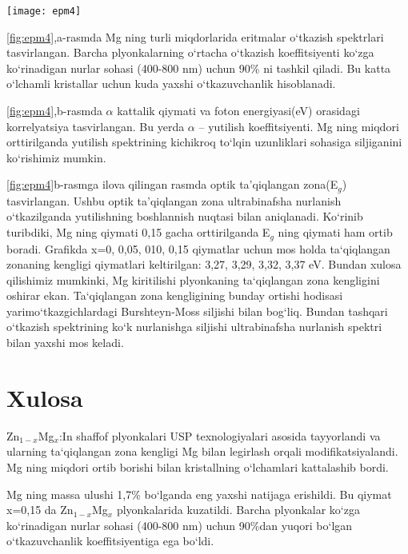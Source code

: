 \documentclass[14pt]{scrarticle}
\begin{document}
\begin{figure*}[h]
	\centering
	\texttt{[image: epm4]}
	\caption{Mg ning turli konsentratsiyalarida yupqa plyonkalarning o`tkazish spektri(a) va $\alpha$ qiymat va foto energiya orasidagi korrelyatsiya}
	\label{fig:epm4}
\end{figure*}
	\ref{fig:epm4},a-rasmda Mg ning turli miqdorlarida eritmalar o`tkazish spektrlari tasvirlangan. Barcha plyonkalarning o`rtacha o`tkazish koeffitsiyenti ko`zga ko`rinadigan nurlar sohasi (400-800 nm) uchun 90\% ni tashkil qiladi. Bu katta o`lchamli kristallar uchun kuda yaxshi o`tkazuvchanlik hisoblanadi.
	
\ref{fig:epm4},b-rasmda $\alpha$ kattalik qiymati va foton energiyasi(eV) orasidagi korrelyatsiya tasvirlangan. Bu yerda $\alpha$ -- yutilish koeffitsiyenti. Mg ning miqdori orttirilganda yutilish spektrining kichikroq to`lqin uzunliklari sohasiga siljiganini ko`rishimiz mumkin.  

\ref{fig:epm4}b-rasmga ilova qilingan rasmda optik ta'qiqlangan zona(E$_{g}$) tasvirlangan. Ushbu optik ta'qiqlangan zona ultrabinafsha nurlanish o`tkazilganda yutilishning boshlannish nuqtasi bilan aniqlanadi. Ko`rinib turibdiki, Mg ning qiymati 0,15 gacha orttirilganda E$_{g}$ ning qiymati ham ortib boradi. Grafikda x=0, 0,05, 010, 0,15 qiymatlar uchun mos holda ta`qiqlangan zonaning kengligi qiymatlari keltirilgan: 3,27, 3,29, 3,32, 3,37 eV. Bundan xulosa qilishimiz mumkinki, Mg kiritilishi plyonkaning ta`qiqlangan zona kengligini oshirar ekan. Ta`qiqlangan zona kengligining bunday ortishi hodisasi yarimo`tkazgichlardagi  Burshteyn-Moss siljishi bilan bog`liq. Bundan tashqari o`tkazish spektrining ko`k nurlanishga siljishi ultrabinafsha nurlanish spektri bilan yaxshi mos keladi. 
	
\newpage
{}
\section*{Xulosa}
	\noindent	
	Zn$_{1-x}$Mg$_{x}$:In shaffof plyonkalari USP texnologiyalari asosida tayyorlandi va ularning ta`qiqlangan zona kengligi Mg bilan legirlash orqali modifikatsiyalandi. Mg ning miqdori ortib borishi bilan kristallning o`lchamlari kattalashib bordi.
	
	Mg ning massa ulushi 1,7\% bo`lganda eng yaxshi natijaga erishildi. Bu qiymat x=0,15 da Zn$_{1-x}$Mg$_{x}$ plyonkalarida kuzatildi. Barcha plyonkalar ko`zga ko`rinadigan nurlar sohasi (400-800 nm) uchun 90\%dan yuqori bo`lgan o`tkazuvchanlik koeffitsiyentiga ega bo`ldi.
	
\end{document}
